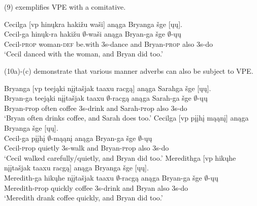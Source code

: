 \documentclass[output=paper]{LSP/langsci}
\begin{document}
(9) exemplifies VPE with a comitative.

\begin{exe}
\ex
\glll Cecilga {\textsc [vp} hin\k{u}kra haki\v{z}u wa\v{s}i{\textsc ]} an\k{a}ga Bryanga \v{s}ge {\textsc [}\k{u}\k{u}{\textsc ]}.\\
Cecil-ga {} hin\k{u}k-ra haki\v{z}u $\emptyset$-wa\v{s}i an\k{a}ga Bryan-ga \v{s}ge $\emptyset$-\k{u}\k{u}\\
Cecil-\textsc{prop} {} woman-\textsc{def} be.with {\textsc 3s}-dance and Bryan-\textsc{prop} also {\textsc 3s}-do\\
\trans `Cecil danced with the woman, and Bryan did too.'
\end{exe}

(10a)-(c) demonstrate that various manner adverbs can also be subject to VPE.

\begin{exe}
\ex
\begin{xlist}
\ex
\glll Bryanga  {\textsc [vp} teej\k{a}ki {n\k{i}\k{i}ta\v{s}jak taaxu} racg\k{a}{\textsc ]} an\k{a}ga Sarahga \v{s}ge {\textsc [}\k{u}\k{u}{\textsc ]}.\\ 
Bryan-ga {} teej\k{a}ki {n\k{i}\k{i}ta\v{s}jak taaxu} $\emptyset$-racg\k{a} an\k{a}ga Sarah-ga \v{s}ge $\emptyset$-\k{u}\k{u}\\
Bryan-{\textsc prop} {} often coffee {\textsc 3s}-drink and Sarah-{\textsc prop} also {\textsc 3s}-do\\
\trans `Bryan often drinks coffee, and Sarah does too.'
\ex
\glll Cecilga  {\textsc [vp} p\k{i}\k{i}h\k{i} m\k{a}\k{a}n\k{i}{\textsc ]} an\k{a}ga Bryanga \v{s}ge {\textsc [}\k{u}\k{u}{\textsc ]}.\\
Cecil-ga {} p\k{i}\k{i}h\k{i} $\emptyset$-m\k{a}\k{a}n\k{i} an\k{a}ga Bryan-ga \v{s}ge $\emptyset$-\k{u}\k{u}\\
Cecil-{\textsc prop} {} quietly {\textsc 3s}-walk and Bryan-{\textsc prop} also {\textsc 3s}-do\\
\trans `Cecil walked carefully/quietly, and Bryan did too.'
\ex
\glll Meredithga {\textsc [vp} hik\k{u}he {n\k{i}\k{i}ta\v{s}jak taaxu} racg\k{a}{\textsc ]} an\k{a}ga Bryanga \v{s}ge {\textsc [}\k{u}\k{u}{\textsc ]}.\\
Meredith-ga {} hik\k{u}he {n\k{i}\k{i}ta\v{s}jak taaxu} $\emptyset$-racg\k{a} an\k{a}ga Bryan-ga \v{s}ge $\emptyset$-\k{u}\k{u}\\
Meredith-{\textsc prop} {} quickly coffee {\textsc 3s}-drink and Bryan also {\textsc 3s}-do\\
\trans `Meredith drank coffee quickly, and Bryan did too.'
\end{xlist}
\end{exe}
\end{document}
